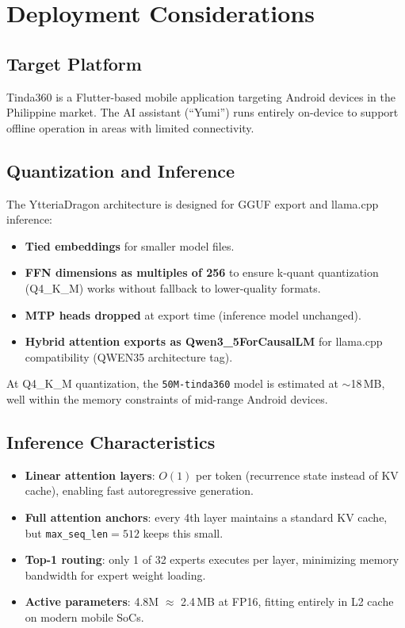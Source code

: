 \documentclass[11pt,a4paper]{article}
\begin{document}
\section{Deployment Considerations}
\label{sec:deployment}

\subsection{Target Platform}

Tinda360 is a Flutter-based mobile application targeting Android devices in
the Philippine market. The AI assistant (``Yumi'') runs entirely on-device
to support offline operation in areas with limited connectivity.

\subsection{Quantization and Inference}

The YtteriaDragon architecture is designed for GGUF export and llama.cpp
inference:

\begin{itemize}[leftmargin=*]
  \item \textbf{Tied embeddings} for smaller model files.
  \item \textbf{FFN dimensions as multiples of 256} to ensure k-quant
    quantization (Q4\_K\_M) works without fallback to lower-quality formats.
  \item \textbf{MTP heads dropped} at export time (inference model unchanged).
  \item \textbf{Hybrid attention exports as Qwen3\_5ForCausalLM} for
    llama.cpp compatibility (QWEN35 architecture tag).
\end{itemize}

At Q4\_K\_M quantization, the \texttt{50M-tinda360} model is estimated at
$\sim$18\,MB, well within the memory constraints of mid-range Android devices.

\subsection{Inference Characteristics}

\begin{itemize}[leftmargin=*]
  \item \textbf{Linear attention layers}: $O(1)$ per token (recurrence state
    instead of KV cache), enabling fast autoregressive generation.
  \item \textbf{Full attention anchors}: every 4th layer maintains a standard
    KV cache, but \texttt{max\_seq\_len}$=512$ keeps this small.
  \item \textbf{Top-1 routing}: only 1 of 32 experts executes per layer,
    minimizing memory bandwidth for expert weight loading.
  \item \textbf{Active parameters}: 4.8M $\approx$ 2.4\,MB at FP16, fitting
    entirely in L2 cache on modern mobile SoCs.
\end{itemize}
\end{document}
